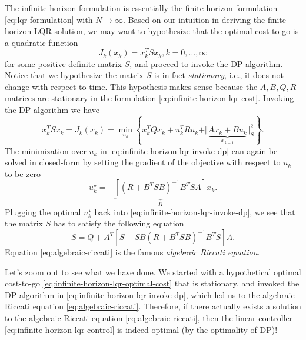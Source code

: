 \documentclass[
]{book}
\theoremstyle{definition}
\theoremstyle{definition}
\theoremstyle{definition}
\theoremstyle{definition}
\theoremstyle{remark}
\begin{document}
The infinite-horizon formulation is essentially the finite-horizon formulation \eqref{eq:lqr-formulation} with \(N \rightarrow \infty\). Based on our intuition in deriving the finite-horizon LQR solution, we may want to hypothesize that the optimal cost-to-go is a quadratic function
\begin{equation}
J_{k}(x_{k}) = x_{k}^T S x_{k}, k=0,\dots,\infty
\label{eq:infinite-horizon-lqr-optimal-cost}
\end{equation}
for some positive definite matrix \(S\), and proceed to invoke the DP algorithm. Notice that we hypothesize the matrix \(S\) is in fact \emph{stationary}, i.e., it does not change with respect to time. This hypothesis makes sense because the \(A,B,Q,R\) matrices are stationary in the formulation \eqref{eq:infinite-horizon-lqr-cost}. Invoking the DP algorithm we have
\begin{equation}
x_k^T S x_k = J_k(x_k) = \min_{u_k} \left\{ x_k^T Q x_k + u_k^T R u_k + \Vert \underbrace{A x_k + B u_k}_{x_{k+1}} \Vert_S^2  \right\}.
\label{eq:infinite-horizon-lqr-invoke-dp}
\end{equation}
The minimization over \(u_k\) in \eqref{eq:infinite-horizon-lqr-invoke-dp} can again be solved in closed-form by setting the gradient of the objective with respect to \(u_k\) to be zero
\begin{equation}
u_k^\star = - \underbrace{\left[ \left( R + B^T S B \right)^{-1} B^T S A \right]}_{K} x_k.
\label{eq:infinite-horizon-lqr-control}
\end{equation}
Plugging the optimal \(u_k^\star\) back into \eqref{eq:infinite-horizon-lqr-invoke-dp}, we see that the matrix \(S\) has to satisfy the following equation
\begin{equation}
S = Q + A^T \left[  S - SB \left( R + B^T S B  \right)^{-1} B^T S \right] A.
\label{eq:algebraic-riccati}
\end{equation}
Equation \eqref{eq:algebraic-riccati} is the famous \emph{algebraic Riccati equation}.

Let's zoom out to see what we have done. We started with a hypothetical optimal cost-to-go \eqref{eq:infinite-horizon-lqr-optimal-cost} that is stationary, and invoked the DP algorithm in \eqref{eq:infinite-horizon-lqr-invoke-dp}, which led us to the algebraic Riccati equation \eqref{eq:algebraic-riccati}. Therefore, if there actually exists a solution to the algebraic Riccati equation \eqref{eq:algebraic-riccati}, then the linear controller \eqref{eq:infinite-horizon-lqr-control} is indeed optimal (by the optimality of DP)!
\end{document}
